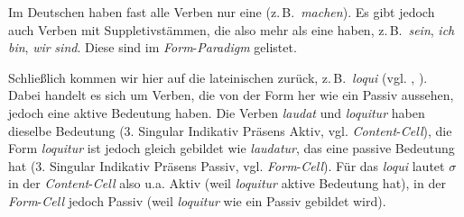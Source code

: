 \begin{table}
\caption{Beispiele für Content-Cell, Form-Cell und Realisierung}\label{table4.4}\small
{}
\end{table}

Im Deutschen haben fast alle Verben nur eine  (z.\,B.\ \textit{machen}). Es gibt jedoch auch Verben mit Suppletivstämmen, die also mehr als eine  haben, z.\,B.\ \textit{sein}, \textit{ich} \textit{bin}, \textit{wir} \textit{sind}. Diese  sind im \textit{Form}{}-\textit{Paradigm} gelistet.

Schließlich kommen wir hier auf die lateinischen  zurück, z.\,B.\ \textit{loqui} (vgl. , ). Dabei handelt es sich um Verben, die von der Form her wie ein Passiv aussehen, jedoch eine aktive Bedeutung haben. Die Verben \textit{laudat} und \textit{loquitur} haben dieselbe Bedeutung (3. Singular Indikativ Präsens Aktiv, vgl. \textit{Content}{}-\textit{Cell}), die Form \textit{loquitur} ist jedoch gleich gebildet wie \textit{laudatur}, das eine passive Bedeutung hat (3. Singular Indikativ Präsens Passiv, vgl. \textit{Form}{}-\textit{Cell}). Für das  \textit{loqui} lautet $\sigma $ in der \textit{Content}{}-\textit{Cell} also u.a. Aktiv (weil \textit{loquitur} aktive Bedeutung hat), in der \textit{Form}{}-\textit{Cell} jedoch Passiv (weil \textit{loquitur} wie ein Passiv gebildet wird).

